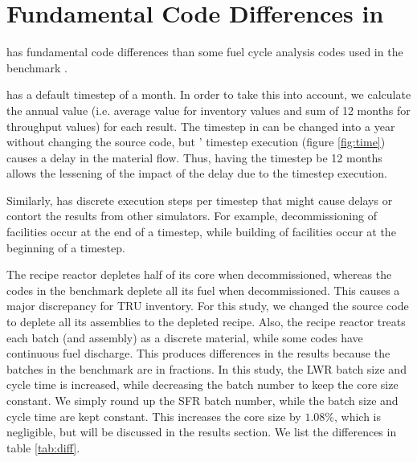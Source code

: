 
\section{Fundamental Code Differences in \Cyclus}

\Cyclus has fundamental code differences than some fuel cycle analysis codes
used in the benchmark \cite{feng_standardized_2016}.

\Cyclus has a default timestep of a month. In order to take
this into account, we calculate the annual value
(i.e. average value for inventory values and sum of 12 months
for throughput values) for each result. The timestep in \Cyclus
can be changed into a year without changing the source
code, but \Cyclus' timestep execution (figure \ref{fig:time}) causes a delay
in the material flow. Thus, having the timestep be 12 months
allows the lessening of the impact of the delay due to the
\Cyclus timestep execution.

Similarly, \Cyclus has discrete
execution steps per timestep that might cause delays or contort
the results from other simulators. For example, decommissioning of
facilities occur at the end of a timestep, while building of facilities
occur at the beginning of a timestep.

The \Cycamore recipe reactor depletes half of its core when decommissioned,
whereas the codes in the benchmark \cite{feng_standardized_2016} deplete all its fuel when decommissioned. This causes a major
discrepancy for \gls{TRU} inventory. For this study, we changed
the \Cycamore source code to deplete all its assemblies to the depleted recipe.
Also, the \Cycamore recipe reactor treats each batch (and assembly) as a discrete
material, while some codes have continuous fuel discharge. This produces
differences in the results because the batches in the benchmark \cite{feng_standardized_2016} are in fractions.
In this study, the \gls{LWR} batch size and cycle time is increased, while
decreasing the batch number to keep the core size constant. We simply round
up the \gls{SFR} batch number, while the batch size and cycle time are kept constant.
This increases the core size by $1.08 \%$, which is negligible, but will be
discussed in the results section.
We list the differences in table \ref{tab:diff}.

